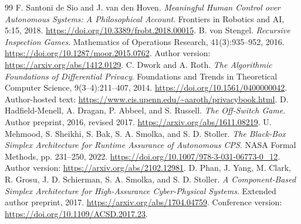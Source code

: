 \documentclass[11pt,letterpaper]{article}
\theoremstyle{plain}
\theoremstyle{definition}
\theoremstyle{remark}
\begin{document}
\begin{thebibliography}{99}
 F. Santoni de Sio and J. van den Hoven. \emph{Meaningful Human Control over Autonomous Systems: A Philosophical Account}. Frontiers in Robotics and AI, 5:15, 2018. \url{https://doi.org/10.3389/frobt.2018.00015}.
 B. von Stengel. \emph{Recursive Inspection Games}. Mathematics of Operations Research, 41(3):935--952, 2016. \url{https://doi.org/10.1287/moor.2015.0762}. Author version: \url{https://arxiv.org/abs/1412.0129}.
 C. Dwork and A. Roth. \emph{The Algorithmic Foundations of Differential Privacy}. Foundations and Trends in Theoretical Computer Science, 9(3--4):211--407, 2014. \url{https://doi.org/10.1561/0400000042}. Author-hosted text: \url{https://www.cis.upenn.edu/~aaroth/privacybook.html}.
 D. Hadfield-Menell, A. Dragan, P. Abbeel, and S. Russell. \emph{The Off-Switch Game}. Author preprint, 2016, revised 2017. \url{https://arxiv.org/abs/1611.08219}.
 U. Mehmood, S. Sheikhi, S. Bak, S. A. Smolka, and S. D. Stoller. \emph{The Black-Box Simplex Architecture for Runtime Assurance of Autonomous CPS}. NASA Formal Methods, pp. 231--250, 2022. \url{https://doi.org/10.1007/978-3-031-06773-0_12}. Author version: \url{https://arxiv.org/abs/2102.12981}.
 D. Phan, J. Yang, M. Clark, R. Grosu, J. D. Schierman, S. A. Smolka, and S. D. Stoller. \emph{A Component-Based Simplex Architecture for High-Assurance Cyber-Physical Systems}. Extended author preprint, 2017. \url{https://arxiv.org/abs/1704.04759}. Conference version: \url{https://doi.org/10.1109/ACSD.2017.23}.

\end{thebibliography}
\end{document}
